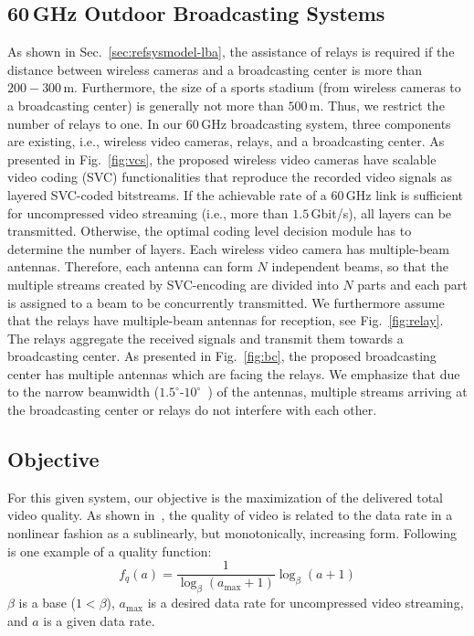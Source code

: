 \documentclass[conference]{IEEEtran}
\begin{document}
\subsection{60\,GHz Outdoor Broadcasting Systems}\label{sec:refsysmodel-model}


As shown in Sec.~\ref{sec:refsysmodel-lba}, the assistance of relays is required if the distance between wireless cameras and a broadcasting center is more than $200 - 300$\,m.
Furthermore, the size of a sports stadium (from wireless cameras to a broadcasting center) is generally not more than $500$\,m. Thus, we restrict the number of relays to one.
In our 60\,GHz broadcasting system, three components are existing, i.e., wireless video cameras, relays, and a broadcasting center.
As presented in Fig.~\ref{fig:vcs}, the proposed wireless video cameras have scalable video coding (SVC) functionalities that reproduce the recorded video signals as layered SVC-coded bitstreams.
If the achievable rate of a 60\,GHz link is sufficient for uncompressed video streaming (i.e., more than $1.5$\,Gbit/s), all layers can be transmitted.
Otherwise, the optimal coding level decision module has to determine the number of layers.
Each wireless video camera has multiple-beam antennas.
Therefore, each antenna can form $N$ independent beams, so that the multiple streams created by SVC-encoding are divided into $N$ parts and each part is assigned to a beam to be concurrently transmitted.
We furthermore assume that the relays have multiple-beam antennas for reception, see
Fig.~\ref{fig:relay}. The relays aggregate the received signals and transmit them towards a broadcasting center. As presented in Fig.~\ref{fig:bc}, the proposed broadcasting center has multiple antennas which are facing the relays. We emphasize that due to the narrow beamwidth ($1.5^{\circ}$-$10^{\circ}$~\cite{comotech}) of the antennas, multiple streams arriving at the broadcasting center or relays do not interfere with each other.


\subsection{Objective}\label{sec:objective}
For this given system, our objective is the maximization of the delivered total video quality.
As shown in~\cite{kim12tbc}, the quality of video is related to the data rate in a nonlinear fashion as a sublinearly, but monotonically, increasing form.
Following is one example of a quality function:
\begin{equation}
f_{q}(a) = \frac{1}{\log_{\beta}(a_{\text{max}}+1)} \log_{\beta}(a+1)
\end{equation}
$\beta$ is a base ($1<\beta$), $a_{\text{max}}$ is a desired data rate for uncompressed video streaming, and $a$ is a given data rate.
\end{document}
